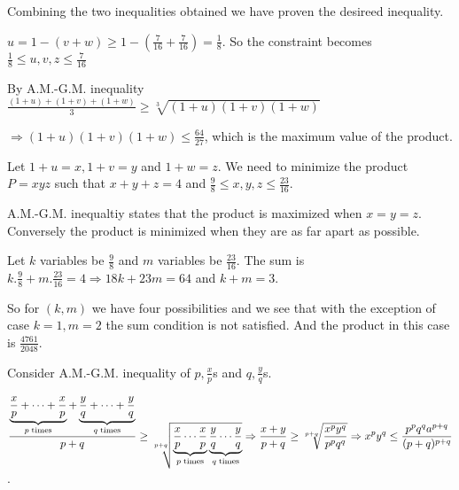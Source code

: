   Combining the two inequalities obtained we have proven the desireed inequality.
\item $u = 1 - (v + w)\geq 1 - \left(\frac{7}{16} + \frac{7}{16}\right) = \frac{1}{8}$. So the constraint
  becomes $\frac{1}{8}\leq u, v, z\leq \frac{7}{16}$

  By A.M.-G.M. inequality $\frac{(1 + u) + (1 + v) + (1 + w)}{3}\geq \sqrt[3]{(1 + u)(1 + v)(1 + w)}$

  $\Rightarrow (1 + u)(1 + v)(1 + w)\leq \frac{64}{27}$, which is the maximum value of the product.

  Let $1 + u = x, 1 + v = y$ and $1 + w = z$. We need to minimize the product $P = xyz$ such that $x + y + z
  = 4$ and $\frac{9}{8}\leq x, y, z\leq \frac{23}{16}$.

  A.M.-G.M. inequaltiy states that the product is maximized when $x = y = z$. Conversely the product is
  minimized when they are as far apart as possible.

  Let $k$ variables be $\frac{9}{8}$ and $m$ variables be $\frac{23}{16}$. The sum is $k.\frac{9}{8} +
  m.\frac{23}{16} = 4 \Rightarrow 18k + 23m = 64$ and $k + m = 3$.

  So for $(k, m)$ we have four possibilities and we see that with the exception of case $k = 1, m = 2$ the
  sum condition is not satisfied. And the product in this case is $\frac{4761}{2048}$.
\item Consider A.M.-G.M. inequality of $p, \frac{x}{p}$s and $q, \frac{y}{q}$s.

  $\displaystyle\frac{\underbrace{\frac{x}{p} + \cdots + \frac{x}{p}}_{p\;\rm {times}} + \underbrace{\frac{y}{q} +
    \cdots + \frac{y}{q}}_{q\;\rm {times}}}{p + q}\geq \sqrt[p + q]{\underbrace{\frac{x}{p} \cdots
  \frac{x}{p}}_{p\;\rm {times}}\underbrace{\frac{y}{q} \cdots \frac{y}{q}}_{q\;\rm {times}}} \Rightarrow
  \displaystyle\frac{x + y}{p + q}\geq \sqrt[p + q]{\frac{x^py^q}{p^pq^q}} \Rightarrow
  x^py^q\leq \frac{p^pq^qa^{p + q}}{(p + q)^{p + q}}$.
\item
\stopitemize
